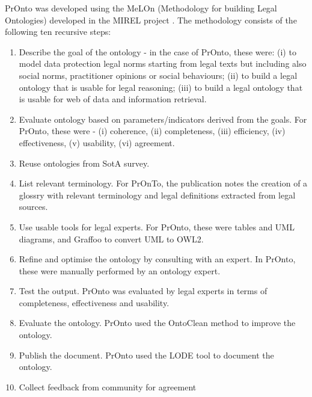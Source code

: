 PrOnto was developed using the MeLOn (Methodology for building Legal Ontologies) developed in the MIREL project \cite{palmirani_pronto:_2018,palmirani_pronto:_2018-1,monica_modelling_2018}. The methodology consists of the following ten recursive steps:
\begin{enumerate}
    \item Describe the goal of the ontology - in the case of PrOnto, these were: 
            (i) to model data protection legal norms starting from legal texts but including
also social norms, practitioner opinions or social behaviours;
            (ii) to build a legal ontology that is usable for legal reasoning;
            (iii) to build a legal ontology that is usable for web of data and information
retrieval.
    \item Evaluate ontology based on parameters/indicators derived from the goals. For PrOnto, these were - (i) coherence, (ii) completeness, (iii) efficiency, (iv) effectiveness, (v) usability, (vi) agreement.
    \item Reuse ontologies from SotA survey.
    \item List relevant terminology. For PrOnTo, the publication notes the creation of a glossry with relevant terminology and legal definitions extracted from legal sources.
    \item Use usable tools for legal experts. For PrOnto, these were tables and UML diagrams, and Graffoo to convert UML to OWL2.
    \item Refine and optimise the ontology by consulting with an expert. In PrOnto, these were manually performed by an ontology expert.
    \item Test the output. PrOnto was evaluated by legal experts in terms of completeness, effectiveness and usability.
    \item Evaluate the ontology. PrOnto used the OntoClean method to improve the ontology.
    \item Publish the document. PrOnto used the LODE tool to document the ontology.
    \item Collect feedback from community for agreement
\end{enumerate}

